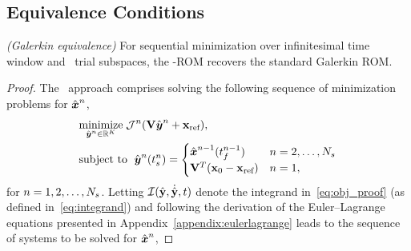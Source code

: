 \subsection{Equivalence Conditions}
\begin{theorem}\label{theorem:galerkin_equiv}\textit{(Galerkin equivalence)}
For sequential minimization over infinitesimal time window and \spatialAcronym\ trial subspaces, the \methodAcronym-ROM recovers the standard Galerkin ROM.
\end{theorem}
\begin{proof}
The \methodAcronym\ approach comprises solving the following sequence of minimization problems for $\genstateArgnt{n}$,
\begin{equation}\label{eq:obj_proof}
\begin{split}
      & \underset{\genstateyArgnt{n} \in \RR{\romdim}}{\text{minimize}}\; \mathcal{J}^n(\basisspace \genstateyArgnt{n} + \stateIntercept), \\ 
      & \text{subject to }\; \genstateyArg{n}{\timeStartArg{n}} =
\begin{cases} \genstateArg{n-1}{\timeEndArg{n-1}} & n = 2,\ldots,\nslabs \\
\genstateIC & n=1, \end{cases} 
\end{split}
\end{equation}
for $n = 1,2,\ldots,\nslabs$. Letting $\minintegrandArg{n}(\genstateyDiscrete,\dot{\genstateyDiscrete},t)$ denote the integrand in~\eqref{eq:obj_proof} (as defined in~\eqref{eq:integrand}) and following the derivation of the Euler--Lagrange equations presented in Appendix~\ref{appendix:eulerlagrange} leads to the sequence of systems to be solved for $\genstate^n$,


\end{proof}
